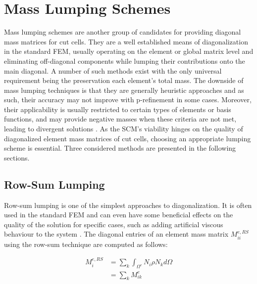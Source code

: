 %
\section{Mass Lumping Schemes}
\label{section:masslumpingschemes}
%

Mass lumping schemes are another group of candidates for providing diagonal mass
matrices for cut cells. They are a well established means of diagonalization
in the standard FEM, usually operating on the element or global matrix level
and eliminating off-diagonal components while lumping their contributions onto the
main diagonal. A number of such methods exist with the only universal requirement
being the preservation each element's total mass. The downside of mass lumping
techniques is that they are generally heuristic approaches and as such, their
accuracy may not improve with p-refinement in some cases. Moreover, their applicability is usually
restricted to certain types of elements or basis functions, and may provide negative
masses when these criteria are not met, leading to divergent solutions \cite{Duczek2019}.
As the SCM's viability hinges on the quality of diagonalized element mass matrices
of cut cells, choosing an appropriate lumping scheme is essential. Three considered
methods are presented in the following sections.

%
\subsection{Row-Sum Lumping}
\label{section:rowsumlumping}
%

Row-sum lumping is one of the simplest approaches to diagonalization.
It is often used in the standard FEM and can even have some beneficial effects on the quality
of the solution for specific cases, such as adding artificial viscous behaviour to the system \cite{Hughes2000}.
The diagonal entries of an element mass matrix $M_{ii}^{e,RS}$ using the row-sum technique are computed as follows:

\begin{equation} \label{eq:rowsumlumping}
	\begin{array}{rl}
	M_{i}^{e,RS}
	
	&= \sum_k \int_{\Omega^e} N_i \rho N_k d\Omega \\[0.5em]
	&= \sum_k M_{ik}^e
		
	\end{array}
\end{equation}


